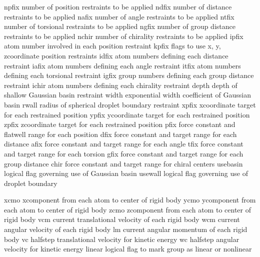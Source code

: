 \documentclass[letterpaper,11pt,english]{sphinxmanual}
\begin{document}
\begin{sphinxVerbatim}[commandchars=\\\{\}]
npfix           number of position restraints to be applied
ndfix           number of distance restraints to be applied
nafix           number of angle restraints to be applied
ntfix           number of torsional restraints to be applied
ngfix           number of group distance restraints to be applied
nchir           number of chirality restraints to be applied
ipfix           atom number involved in each position restraint
kpfix           flags to use x\PYGZhy{}, y\PYGZhy{}, z\PYGZhy{}coordinate position restraints
idfix           atom numbers defining each distance restraint
iafix           atom numbers defining each angle restraint
itfix           atom numbers defining each torsional restraint
igfix           group numbers defining each group distance restraint
ichir           atom numbers defining each chirality restraint
depth           depth of shallow Gaussian basin restraint
width           exponential width coefficient of Gaussian basin
rwall           radius of spherical droplet boundary restraint
xpfix           x\PYGZhy{}coordinate target for each restrained position
ypfix           y\PYGZhy{}coordinate target for each restrained position
zpfix           z\PYGZhy{}coordinate target for each restrained position
pfix            force constant and flat\PYGZhy{}well range for each position
dfix            force constant and target range for each distance
afix            force constant and target range for each angle
tfix            force constant and target range for each torsion
gfix            force constant and target range for each group distance
chir            force constant and target range for chiral centers
use\PYGZus{}basin       logical flag governing use of Gaussian basin
use\PYGZus{}wall        logical flag governing use of droplet boundary
\end{sphinxVerbatim}

\sphinxAtStartPar
{}

\begin{sphinxVerbatim}[commandchars=\\\{\}]
xcmo            x\PYGZhy{}component from each atom to center of rigid body
ycmo            y\PYGZhy{}component from each atom to center of rigid body
zcmo            z\PYGZhy{}component from each atom to center of rigid body
vcm             current translational velocity of each rigid body
wcm             current angular velocity of each rigid body
lm              current angular momentum of each rigid body
vc              half\PYGZhy{}step translational velocity for kinetic energy
wc              half\PYGZhy{}step angular velocity for kinetic energy
linear          logical flag to mark group as linear or nonlinear
\end{sphinxVerbatim}
\end{document}
